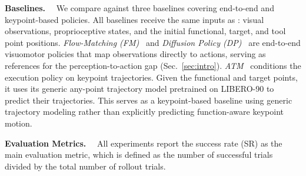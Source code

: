 \textbf{Baselines.}~~
We compare \algoname{} against three baselines covering end-to-end and keypoint-based policies.
All baselines receive the same inputs as \algoname{}: visual observations, proprioceptive states, and the initial functional, target, and tool point positions.
\textit{Flow-Matching (FM)}~\citep{lipmanflow} and \textit{Diffusion Policy (DP)}~\citep{chi2025diffusion} are end-to-end visuomotor policies that map observations directly to actions, serving as references for the perception-to-action gap (Sec.~\ref{sec:intro}).
\textit{ATM}~\citep{wen2023any} conditions the execution policy on keypoint trajectories. Given the functional and target points, it uses its generic any-point trajectory model pretrained on LIBERO-90 to predict their trajectories. This serves as a keypoint-based baseline using generic trajectory modeling rather than explicitly predicting function-aware keypoint motion.


\textbf{Evaluation Metrics.}~~
All experiments report the success rate (SR) as the main evaluation metric, which is defined as the number of successful trials divided by the total number of rollout trials.


